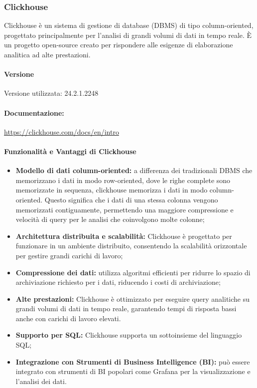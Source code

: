 \subsubsection{Clickhouse} \label{sec:clickHouse}
Clickhouse è un sistema di gestione di database (DBMS) di tipo column-oriented, progettato principalmente per l'analisi di grandi volumi di dati in tempo reale. È un progetto open-source creato per rispondere alle esigenze di elaborazione analitica ad alte prestazioni.

\paragraph{Versione}
Versione utilizzata: 24.2.1.2248
\paragraph{Documentazione:}
\url{https://clickhouse.com/docs/en/intro}

\paragraph{Funzionalità e Vantaggi di Clickhouse}
\begin{itemize}
    \item \textbf{Modello di dati column-oriented:} a differenza dei tradizionali DBMS che memorizzano i dati in modo row-oriented, dove le righe complete sono memorizzate in sequenza, clickhouse memorizza i dati in modo column-oriented. Questo significa che i dati di una stessa colonna vengono memorizzati contiguamente, permettendo una maggiore compressione e velocità di query per le analisi che coinvolgono molte colonne;
    \item \textbf{Architettura distribuita e scalabilità:} Clickhouse è progettato per funzionare in un ambiente distribuito, consentendo la scalabilità orizzontale per gestire grandi carichi di lavoro;
    \item \textbf{Compressione dei dati:} utilizza algoritmi efficienti per ridurre lo spazio di archiviazione richiesto per i dati, riducendo i costi di archiviazione;
    \item \textbf{Alte prestazioni:} Clickhouse è ottimizzato per eseguire query analitiche su grandi volumi di dati in tempo reale, garantendo tempi di risposta bassi anche con carichi di lavoro elevati.
    \item \textbf{Supporto per SQL:} Clickhouse supporta un sottoinsieme del linguaggio SQL;
    \item \textbf{Integrazione con Strumenti di Business Intelligence (BI):} può essere integrato con strumenti di BI popolari come Grafana per la visualizzazione e l'analisi dei dati.
\end{itemize}

